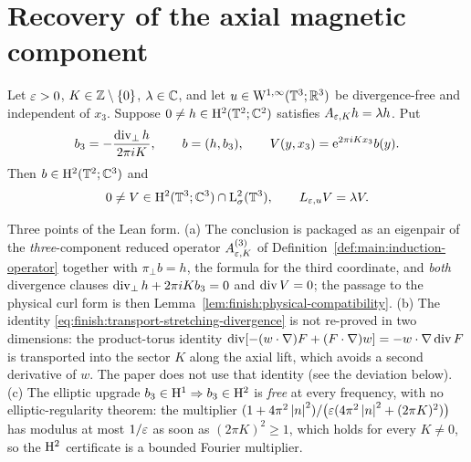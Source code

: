 \section{Recovery of the axial magnetic component}

\begin{lemma}
  \label{lem:axial-recovery}
  \leanok
  Let $\varepsilon>0$, $K\in\mathbb{Z}\setminus\{0\}$, $\lambda\in\mathbb{C}$, and let
  $u\in\mathrm{W}^{1,\infty}(\mathbb{T}^3;\mathbb{R}^3)$ be divergence-free and independent of $x_3$.  Suppose
  $0\neq h\in\mathrm{H}^2(\mathbb{T}^2;\mathbb{C}^2)$ satisfies $A_{\varepsilon,K}h=\lambda h$.  Put
  \[
    b_3=-\frac{\operatorname{div}_\perp h}{2\pi iK},\qquad b=(h,b_3),
    \qquad V(y,x_3)=\mathrm{e}^{2\pi iKx_3}b(y).
  \]
  Then $b\in\mathrm{H}^2(\mathbb{T}^2;\mathbb{C}^3)$ and
  \[
    0\neq V\in\mathrm{H}^2(\mathbb{T}^3;\mathbb{C}^3)\cap\mathrm{L}^2_\sigma(\mathbb{T}^3),\qquad L_{\varepsilon,u}V=\lambda V .
  \]
\end{lemma}

Three points of the Lean form.  (a) The conclusion is packaged as an eigenpair of the
\emph{three}-component reduced operator $A^{(3)}_{\varepsilon,K}$ of
Definition~\ref{def:main:induction-operator} together with
$\pi_\perp b=h$, the formula for the third coordinate, and \emph{both} divergence clauses
$\operatorname{div}_\perp h+2\pi iKb_3=0$ and $\operatorname{div} V=0$; the passage to the physical curl form is then
Lemma~\ref{lem:finish:physical-compatibility}.  (b) The identity
\eqref{eq:finish:transport-stretching-divergence} is not re-proved in two dimensions: the
product-torus identity
$\operatorname{div}[-(w\cdot\nabla)F+(F\cdot\nabla)w]=-w\cdot\nabla\operatorname{div} F$ is transported into the sector
$K$ along the axial lift, which avoids a second derivative of $w$.  The paper does not
use that identity (see the deviation below).  (c) The elliptic upgrade $b_3\in\mathrm{H}^1\Rightarrow b_3\in\mathrm{H}^2$ is
\emph{free} at every frequency, with no elliptic-regularity theorem: the multiplier
$(1+4\pi^2\left\lvert n\right\rvert^2)/\bigl(\varepsilon(4\pi^2\left\lvert n\right\rvert^2+(2\pi K)^2)\bigr)$ has modulus at most
$1/\varepsilon$ as soon as $(2\pi K)^2\geq1$, which holds for every $K\neq0$, so the $\mathrm{H}^2$
certificate is a bounded Fourier multiplier.


